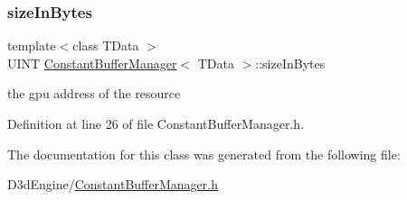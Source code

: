 \mbox{\label{class_constant_buffer_manager_a727c8f79fb25e932dbe2034762282d41}} 
\subsubsection{\texorpdfstring{size\+In\+Bytes}{sizeInBytes}}
{\footnotesize\ttfamily template$<$class T\+Data $>$ \\
U\+I\+NT \mbox{\hyperlink{class_constant_buffer_manager}{Constant\+Buffer\+Manager}}$<$ T\+Data $>$\+::size\+In\+Bytes\hspace{0.3cm}{\ttfamily [private]}}



the gpu address of the resource 



Definition at line 26 of file Constant\+Buffer\+Manager.\+h.



The documentation for this class was generated from the following file\+:\begin{DoxyCompactItemize}
\item 
D3d\+Engine/\mbox{\hyperlink{_constant_buffer_manager_8h}{Constant\+Buffer\+Manager.\+h}}\end{DoxyCompactItemize}
